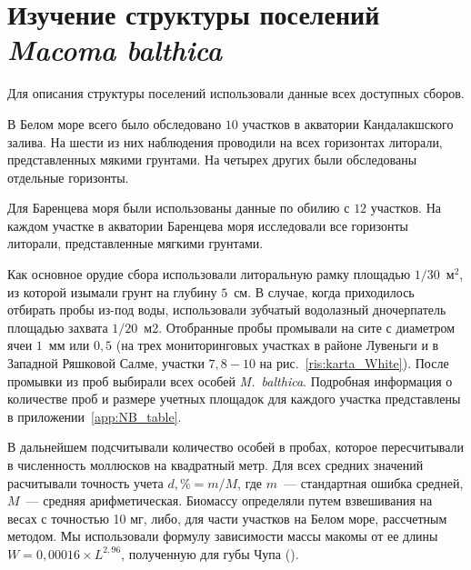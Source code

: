 
\afterpage{\clearpage}	

	\section{Изучение структуры поселений {\it Macoma balthica}}
Для описания структуры поселений использовали данные всех доступных сборов.

В Белом море всего было обследовано $10$ участков в акватории Кандалакшского залива. 
На шести из них наблюдения проводили на всех горизонтах литорали, представленных мякими грунтами.
На четырех других были обследованы отдельные горизонты. 

Для Баренцева моря были использованы данные по обилию с $12$ участков. 
На каждом участке в акватории Баренцева моря исследовали все  горизонты литорали, представленные мягкими грунтами.  

Как основное орудие сбора использовали литоральную рамку площадью $1/30$~м$^2$, из которой изымали грунт на глубину $5$~см. 
В случае, когда приходилось отбирать пробы из-под воды, использовали зубчатый водолазный дночерпатель площадью захвата $1/20$~м2.
Отобранные пробы промывали на сите с диаметром ячеи $1$~мм или $0,5$ (на трех мониторинговых участках в районе Лувеньги и в Западной Ряшковой Салме, участки $7, 8 - 10$ на рис.~\ref{ris:karta_White}). 
После промывки из   проб   выбирали   всех   особей  {\it M.~balthica}.
Подробная информация о количестве проб и размере учетных площадок для каждого участка представлены в приложении~\ref{app:NB_table}.

В дальнейшем подсчитывали количество особей в пробах, которое пересчитывали в численность моллюсков на квадратный метр. 
Для всех средних значений расчитывали точность учета $d,\% = m/M$, где $m$~--- стандартная ошибка средней, $M$~--- средняя арифметическая.
Биомассу определяли путем взвешивания на весах с точностью 10 мг, либо, для части участков на Белом море, рассчетным методом.
Мы использовали формулу зависимости массы макомы от ее длины $W = 0,00016 \times L^{2,96}$, полученную для губы Чупа (\cite{Maximovich_et_al_1993}).


